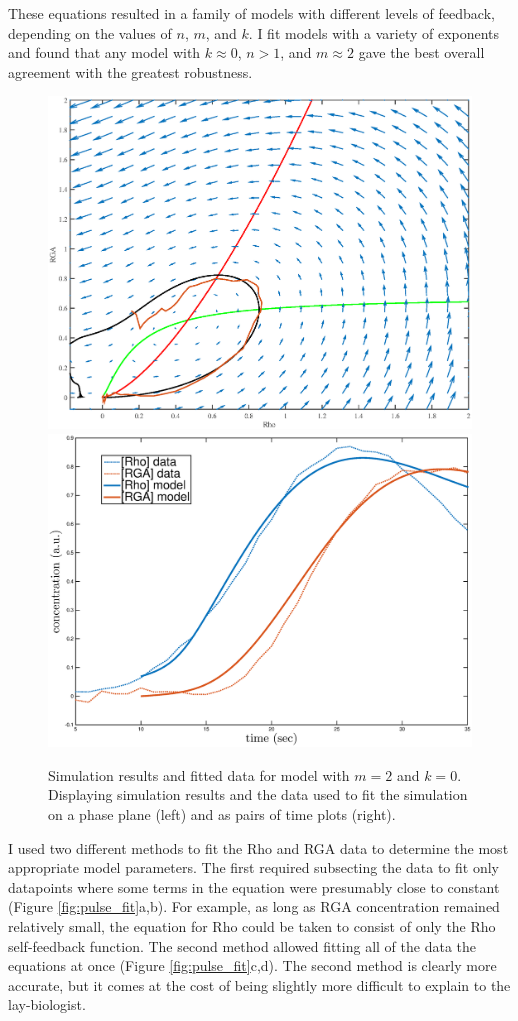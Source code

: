 These equations resulted in a family of models with different levels of feedback, depending on the values of $n$, $m$, and $k$.  I fit models with a variety of exponents and found that any model with $k\approx0$, $n>1$, and $m\approx2$ gave the best overall agreement with the greatest robustness.  
\begin{figure}[h!]
	\centering
	\includegraphics[width=0.45\hsize]{pulse/simple_model_fit_phase.eps}
	\includegraphics[width=0.45\hsize]{pulse/model_profile.eps}
	\caption{\label{fig:pulse_fit_sim}  Simulation results and fitted data for model with $m=2$ and $k=0$. Displaying simulation results and the data used to fit the simulation on a phase plane (left) and as pairs of time plots (right).}
\end{figure}
I used two different methods to fit the Rho and RGA data to determine the most appropriate model parameters.  The first required subsecting the data to fit only datapoints where some terms in the equation were presumably close to constant (Figure \ref{fig:pulse_fit}a,b).  For example, as long as RGA concentration remained relatively small, the equation for Rho could be taken to consist of only the Rho self-feedback function.  The second method allowed fitting all of the data the equations at once (Figure \ref{fig:pulse_fit}c,d).  The second method is clearly more accurate, but it comes at the cost of being slightly more difficult to explain to the lay-biologist.

